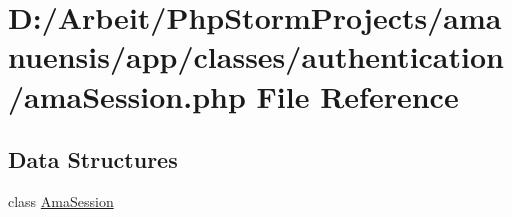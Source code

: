 \hypertarget{a00083}{}\section{D\+:/\+Arbeit/\+Php\+Storm\+Projects/amanuensis/app/classes/authentication/ama\+Session.php File Reference}
\label{a00083}
\subsection*{Data Structures}
\begin{DoxyCompactItemize}
\item 
class \hyperlink{a00009}{Ama\+Session}
\end{DoxyCompactItemize}
